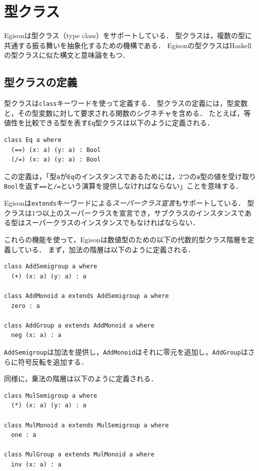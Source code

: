 \section{型クラス}

Egisonは型クラス（type class）をサポートしている．
型クラスは，複数の型に共通する振る舞いを抽象化するための機構である．
Egisonの型クラスはHaskellの型クラスに似た構文と意味論をもつ．

\subsection{型クラスの定義}

型クラスは\lstinline{class}キーワードを使って定義する．
型クラスの定義には，型変数と，その型変数に対して要求される関数のシグネチャを含める．
たとえば，等値性を比較できる型を表す\lstinline{Eq}型クラスは以下のように定義される．
\begin{lstlisting}[language=egison,numbers=none]
class Eq a where
  (==) (x: a) (y: a) : Bool
  (/=) (x: a) (y: a) : Bool
\end{lstlisting}
この定義は，「型\lstinline{a}が\lstinline{Eq}のインスタンスであるためには，2つの\lstinline{a}型の値を受け取り\lstinline{Bool}を返す\lstinline{==}と\lstinline{/=}という演算を提供しなければならない」ことを意味する．

Egisonは\lstinline{extends}キーワードによる\emph{スーパークラス宣言}もサポートしている．
型クラスは1つ以上のスーパークラスを宣言でき，サブクラスのインスタンスである型はスーパークラスのインスタンスでもなければならない．

これらの機能を使って，Egisonは数値型のための以下の代数的型クラス階層を定義している．
まず，加法の階層は以下のように定義される．
\begin{lstlisting}[language=egison,numbers=none]
class AddSemigroup a where
  (+) (x: a) (y: a) : a

class AddMonoid a extends AddSemigroup a where
  zero : a

class AddGroup a extends AddMonoid a where
  neg (x: a) : a
\end{lstlisting}
\lstinline{AddSemigroup}は加法を提供し，\lstinline{AddMonoid}はそれに零元を追加し，\lstinline{AddGroup}はさらに符号反転を追加する．

同様に，乗法の階層は以下のように定義される．
\begin{lstlisting}[language=egison,numbers=none]
class MulSemigroup a where
  (*) (x: a) (y: a) : a

class MulMonoid a extends MulSemigroup a where
  one : a

class MulGroup a extends MulMonoid a where
  inv (x: a) : a
\end{lstlisting}


